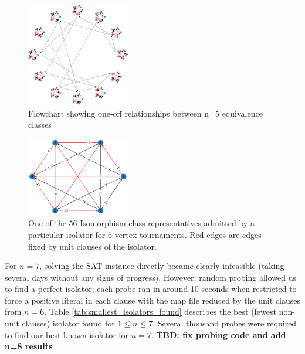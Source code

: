 \documentclass[conference]{IEEEtran}
\begin{document}

\begin{figure}
\centering
\includegraphics[width=0.4\textwidth]{ramsey_5_flowchart.png}
\caption{Flowchart showing one-off relationships between n=5 equivalence classes} \label{flowchart}
\end{figure}

\begin{figure}
\centering
\includegraphics[width=0.4\textwidth]{iso6.png}
\caption{One of the 56 Isomorphism class representatives admitted by a particular isolator for 6-vertex tournaments. Red edges are edges fixed by unit clauses of the isolator.} \label{fig3}
\end{figure}


 For $n = 7$, solving the SAT instance directly became clearly infeasible (taking several days without any signs of progress). However, random probing allowed us to find a perfect isolator; each probe ran in around 10 seconds when restricted to force a positive literal in each clause with the map file reduced by the unit clauses from $n=6$.  Table \ref{tab:smallest_isolators_found} describes the best (fewest non-unit clauses) isolator found for $1 \le n \le 7$. Several thousand probes were required to find our best known isolator for $n=7$. \textbf{TBD: fix probing code and add n=8 results}
\end{document}
